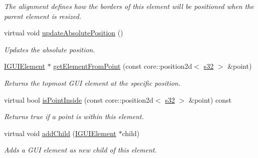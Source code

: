 \begin{DoxyCompactItemize}
\begin{DoxyCompactList}\small\item\em The alignment defines how the borders of this element will be positioned when the parent element is resized. \end{DoxyCompactList}\item 
\mbox{\label{classirr_1_1gui_1_1IGUIElement_ad58bbeba69a118873a5075d86b4c90f2}} 
virtual void \hyperlink{classirr_1_1gui_1_1IGUIElement_ad58bbeba69a118873a5075d86b4c90f2}{update\+Absolute\+Position} ()
\begin{DoxyCompactList}\small\item\em Updates the absolute position. \end{DoxyCompactList}\item 
\hyperlink{classirr_1_1gui_1_1IGUIElement}{I\+G\+U\+I\+Element} $\ast$ \hyperlink{classirr_1_1gui_1_1IGUIElement_ae49f8a5228ce0c18e0c98becf74ee56a}{get\+Element\+From\+Point} (const core\+::position2d$<$ \hyperlink{namespaceirr_ac66849b7a6ed16e30ebede579f9b47c6}{s32} $>$ \&point)
\begin{DoxyCompactList}\small\item\em Returns the topmost G\+UI element at the specific position. \end{DoxyCompactList}\item 
virtual bool \hyperlink{classirr_1_1gui_1_1IGUIElement_a1aaf30a10b77f192dda8c548c109de89}{is\+Point\+Inside} (const core\+::position2d$<$ \hyperlink{namespaceirr_ac66849b7a6ed16e30ebede579f9b47c6}{s32} $>$ \&point) const
\begin{DoxyCompactList}\small\item\em Returns true if a point is within this element. \end{DoxyCompactList}\item 
\mbox{\label{classirr_1_1gui_1_1IGUIElement_a221c8505217aa9c23c621627a0435554}} 
virtual void \hyperlink{classirr_1_1gui_1_1IGUIElement_a221c8505217aa9c23c621627a0435554}{add\+Child} (\hyperlink{classirr_1_1gui_1_1IGUIElement}{I\+G\+U\+I\+Element} $\ast$child)
\begin{DoxyCompactList}\small\item\em Adds a G\+UI element as new child of this element. \end{DoxyCompactList}\item 
\mbox{\label{classirr_1_1gui_1_1IGUIElement_a3171cafaa9d2f3b67c886c60bdd61b32}} 

\end{DoxyCompactItemize}
